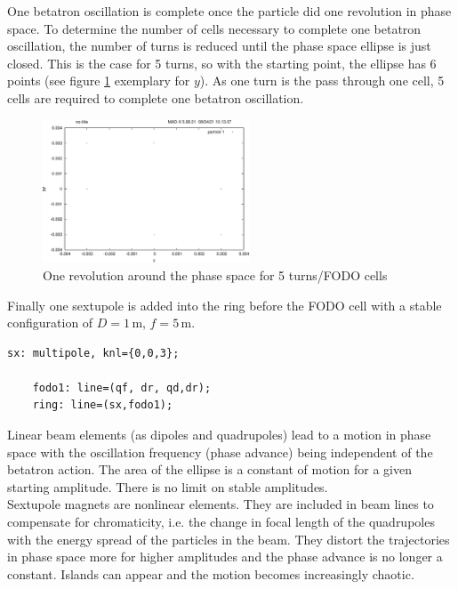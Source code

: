 One betatron oscillation is complete once the particle did one revolution in phase space. To determine the number of cells necessary to complete one betatron oscillation, the number of turns is reduced until the phase space ellipse is just closed. This is the case for 5 turns, so with the starting point, the ellipse has 6 points (see figure \ref{fig:betatron} exemplary for $y$). As one turn is the pass through one cell, 5 cells are required to complete one betatron oscillation.
\begin{figure}[tbp]
    \centering
    \includegraphics[width=0.55\textwidth]{../../part1/turns5.png}
    \caption{One revolution around the phase space for 5 turns/FODO cells}
    \label{fig:betatron}
\end{figure}

Finally one sextupole is added into the ring before the FODO cell with a stable configuration of $D=1\,\mathrm{m}$, $f=5\,\mathrm{m}$.

\begin{lstlisting}[caption=Defining the FODO cell,label={lst:FODOcell}]
    sx: multipole, knl={0,0,3};

    fodo1: line=(qf, dr, qd,dr);
    ring: line=(sx,fodo1);
\end{lstlisting}

Linear beam elements (as dipoles and quadrupoles) lead to a motion in phase space with the oscillation frequency (phase advance) being independent of the betatron action. The area of the ellipse is a constant of motion for a given starting amplitude. There is no limit on stable amplitudes.\\
Sextupole magnets are nonlinear elements. They are included in beam lines to compensate for chromaticity, i.e. the change in focal length of the quadrupoles with the energy spread of the particles in the beam. They distort the trajectories in phase space more for higher amplitudes and the phase advance is no longer a constant. Islands can appear and the motion becomes increasingly chaotic.

